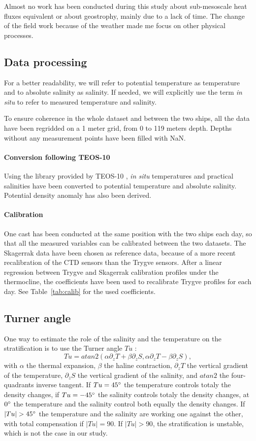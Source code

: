\documentclass[12pt,a4paper]{article}
\begin{document}
Almost no work has been conducted during this study about
sub-mesoscale heat fluxes equivalent or about geostrophy,
mainly due to a lack of time.
The change of the field work because of the weather made me
focus on other physical processes.

\subsection{Data processing}
For a better readability, we will refer to potential temperature as temperature
and to absolute salinity as salinity.
If needed, we will explicitly use the term {\it in situ} to refer to
measured temperature and salinity.

To ensure coherence in the whole dataset and between the two ships,
all the data have been regridded on a 1 meter grid, from 0 to 119 meters depth.
Depths without any measurement points have been filled with NaN.

\paragraph{Conversion following TEOS-10}
Using the library provided by TEOS-10 \citep{gsw}, {\it in situ} temperatures and practical
salinities have been converted to potential temperature and absolute salinity.
Potential density anomaly has also been derived.

\paragraph{Calibration}
One cast has been conducted at the same position with the two ships each day,
so that all the measured variables can be calibrated between the two datasets.
The Skagerrak data have been chosen as reference data, because of a more
recent recalibration of the CTD sensors than the Trygve sensors.
After a linear regression between Trygve and Skagerrak calibration profiles
under the thermocline, the coefficients have been used to recalibrate
Trygve profiles for each day.
See Table~\ref{tab:calib} for the used coefficients.


\subsection{Turner angle}
One way to estimate the role of the salinity and the temperature on the stratification
is to use the Turner angle $Tu$ \citep{ruddick1983, johnson2012}:
\[Tu = atan2(\alpha \partial_z T + \beta \partial_z S,
\alpha \partial_z T - \beta \partial_z S),\]
with $\alpha$ the thermal expansion, $\beta$ the haline contraction,
$\partial_z T$ the vertical gradient of the temperature,
$\partial_z S$ the vertical gradient of the salinity,
and $atan2$ the four-quadrants inverse tangent.
If $Tu = 45^{\circ}$ the temperature controls totaly the density changes,
if $Tu = -45^{\circ}$ the salinity controls totaly the density changes,
at $0 ^{\circ}$ the temperature and the salinity control both equally
the density changes.
If $|Tu| > 45^{\circ}$ the temperature and the salinity are working
one against the other, with total compensation if $|Tu| = 90$.
If  $|Tu| > 90$, the stratification is unstable, which is not the case in
our study.
\end{document}
